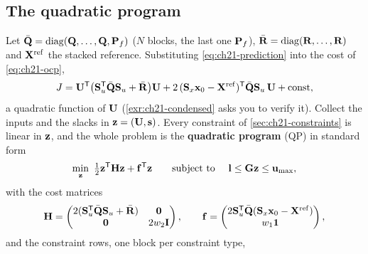 \subsection{The quadratic program}
\label{sec:ch21-qp}

Let $\bar{\mathbf{Q}}=\operatorname{diag}(\mathbf{Q},\dots,\mathbf{Q},\mathbf{P}_f)$ ($N$ blocks, the last
one $\mathbf{P}_f$), $\bar{\mathbf{R}}=\operatorname{diag}(\mathbf{R},\dots,\mathbf{R})$ and
$\mathbf{X}^{\mathrm{ref}}$ the stacked reference. Substituting
\cref{eq:ch21-prediction} into the cost of \cref{eq:ch21-ocp},
\begin{equation}
J=\mathbf{U}^{\mathsf{T}}\bigl(\mathbf{S}_u^{\mathsf{T}}\bar{\mathbf{Q}}\mathbf{S}_u+\bar{\mathbf{R}}\bigr)\mathbf{U}
+2\,(\mathbf{S}_x\mathbf{x}_0-\mathbf{X}^{\mathrm{ref}})^{\mathsf{T}}\bar{\mathbf{Q}}\mathbf{S}_u\,\mathbf{U}+\text{const},
\label{eq:ch21-condensed-cost}
\end{equation}
a quadratic function of $\mathbf{U}$ (\cref{exr:ch21-condensed} asks you to
verify it). Collect the inputs and the slacks in $\mathbf{z}=(\mathbf{U},\mathbf{s})$.
Every constraint of \cref{sec:ch21-constraints} is linear in $\mathbf{z}$, and
the whole problem is the \textbf{quadratic program}
(QP) in standard form
\begin{equation}
\min_{\vect{z}}\ \tfrac12\vect{z}\T\mat{H}\vect{z}+\vect{f}\T\vect{z}
\qquad\st\ \vect{l}\le\mat{G}\vect{z}\le\vect{u}_{\max},
\label{eq:ch21-qp}
\end{equation}
with the cost matrices
\begin{equation}
\mathbf{H}=\begin{pmatrix}2(\mathbf{S}_u^{\mathsf{T}}\bar{\mathbf{Q}}\mathbf{S}_u+\bar{\mathbf{R}})&\mathbf{0}\\\mathbf{0}&2w_2\mathbf{I}\end{pmatrix},\qquad
\mathbf{f}=\begin{pmatrix}2\mathbf{S}_u^{\mathsf{T}}\bar{\mathbf{Q}}(\mathbf{S}_x\mathbf{x}_0-\mathbf{X}^{\mathrm{ref}})\\ w_1\mathbf{1}\end{pmatrix},
\label{eq:ch21-qp-cost}
\end{equation}
and the constraint rows, one block per constraint type,
